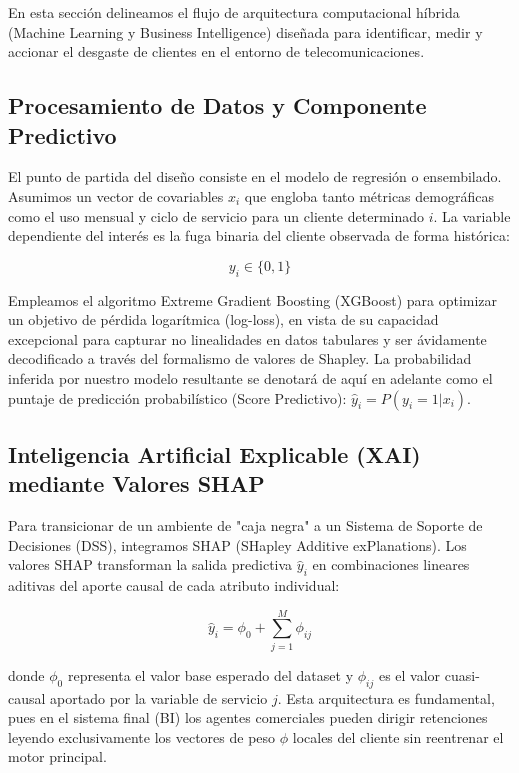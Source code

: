 En esta sección delineamos el flujo de arquitectura computacional híbrida (Machine Learning y Business Intelligence) diseñada para identificar, medir y accionar el desgaste de clientes en el entorno de telecomunicaciones.

\subsection{Procesamiento de Datos y Componente Predictivo}
El punto de partida del diseño consiste en el modelo de regresión o ensembilado. Asumimos un vector de covariables $x_i$ que engloba tanto métricas demográficas como el uso mensual y ciclo de servicio para un cliente determinado $i$. La variable dependiente del interés es la fuga binaria del cliente observada de forma histórica: 

\begin{equation}
y_i \in \{0, 1\}
\end{equation}

Empleamos el algoritmo Extreme Gradient Boosting (XGBoost) para optimizar un objetivo de pérdida logarítmica (log-loss), en vista de su capacidad excepcional para capturar no linealidades en datos tabulares y ser ávidamente decodificado a través del formalismo de valores de Shapley. 
La probabilidad inferida por nuestro modelo resultante se denotará de aquí en adelante como el puntaje de predicción probabilístico (Score Predictivo): $\hat{y}_i = P(y_i=1 | x_i)$.

\subsection{Inteligencia Artificial Explicable (XAI) mediante Valores SHAP}
Para transicionar de un ambiente de "caja negra" a un Sistema de Soporte de Decisiones (DSS), integramos SHAP (SHapley Additive exPlanations). Los valores SHAP transforman la salida predictiva $\hat{y}_i$ en combinaciones lineares aditivas del aporte causal de cada atributo individual:

\begin{equation}
\hat{y}_i = \phi_0 + \sum_{j=1}^{M} \phi_{ij}
\end{equation}

donde $\phi_0$ representa el valor base esperado del dataset y $\phi_{ij}$ es el valor cuasi-causal aportado por la variable de servicio $j$. Esta arquitectura es fundamental, pues en el sistema final (BI) los agentes comerciales pueden dirigir retenciones leyendo exclusivamente los vectores de peso $\phi$ locales del cliente sin reentrenar el motor principal.


